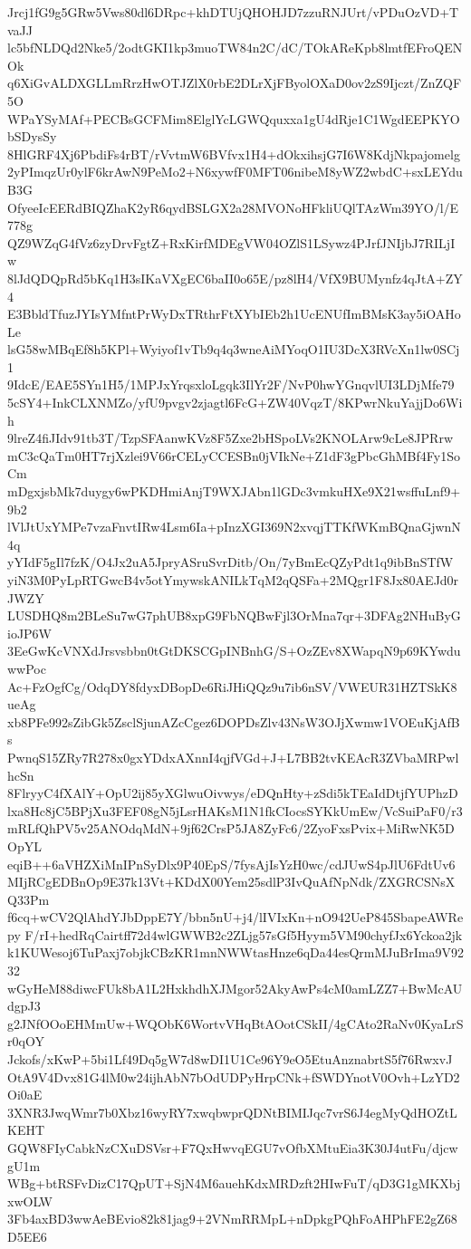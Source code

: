 Jrcj1fG9g5GRw5Vws80dl6DRpc+khDTUjQHOHJD7zzuRNJUrt/vPDuOzVD+TvaJJ
lc5bfNLDQd2Nke5/2odtGKI1kp3muoTW84n2C/dC/TOkAReKpb8lmtfEFroQENOk
q6XiGvALDXGLLmRrzHwOTJZlX0rbE2DLrXjFByolOXaD0ov2zS9Ijczt/ZnZQF5O
WPaYSyMAf+PECBsGCFMim8ElglYcLGWQquxxa1gU4dRje1C1WgdEEPKYObSDysSy
8HlGRF4Xj6PbdiFs4rBT/rVvtmW6BVfvx1H4+dOkxihsjG7I6W8KdjNkpajomelg
2yPImqzUr0ylF6krAwN9PeMo2+N6xywfF0MFT06nibeM8yWZ2wbdC+sxLEYduB3G
OfyeeIcEERdBIQZhaK2yR6qydBSLGX2a28MVONoHFkliUQlTAzWm39YO/l/E778g
QZ9WZqG4fVz6zyDrvFgtZ+RxKirfMDEgVW04OZlS1LSywz4PJrfJNIjbJ7RILjIw
8lJdQDQpRd5bKq1H3sIKaVXgEC6baII0o65E/pz8lH4/VfX9BUMynfz4qJtA+ZY4
E3BbldTfuzJYIsYMfntPrWyDxTRthrFtXYbIEb2h1UcENUfImBMsK3ay5iOAHoLe
lsG58wMBqEf8h5KPl+Wyiyof1vTb9q4q3wneAiMYoqO1IU3DcX3RVcXn1lw0SCj1
9IdcE/EAE5SYn1H5/1MPJxYrqsxloLgqk3IlYr2F/NvP0hwYGnqvlUI3LDjMfe79
5cSY4+InkCLXNMZo/yfU9pvgv2zjagtl6FcG+ZW40VqzT/8KPwrNkuYajjDo6Wih
9lreZ4fiJIdv91tb3T/TzpSFAanwKVz8F5Zxe2bHSpoLVs2KNOLArw9cLe8JPRrw
mC3cQaTm0HT7rjXzlei9V66rCELyCCESBn0jVIkNe+Z1dF3gPbcGhMBf4Fy1SoCm
mDgxjsbMk7duygy6wPKDHmiAnjT9WXJAbn1lGDc3vmkuHXe9X21wsffuLnf9+9b2
lVlJtUxYMPe7vzaFnvtIRw4Lsm6Ia+pInzXGI369N2xvqjTTKfWKmBQnaGjwnN4q
yYIdF5gIl7fzK/O4Jx2uA5JpryASruSvrDitb/On/7yBmEcQZyPdt1q9ibBnSTfW
yiN3M0PyLpRTGwcB4v5otYmywskANILkTqM2qQSFa+2MQgr1F8Jx80AEJd0rJWZY
LUSDHQ8m2BLeSu7wG7phUB8xpG9FbNQBwFjl3OrMna7qr+3DFAg2NHuByGioJP6W
3EeGwKcVNXdJrsvsbbn0tGtDKSCGpINBnhG/S+OzZEv8XWapqN9p69KYwduwwPoc
Ac+FzOgfCg/OdqDY8fdyxDBopDe6RiJHiQQz9u7ib6nSV/VWEUR31HZTSkK8ueAg
xb8PFe992sZibGk5ZsclSjunAZcCgez6DOPDsZlv43NsW3OJjXwmw1VOEuKjAfBs
PwnqS15ZRy7R278x0gxYDdxAXnnI4qjfVGd+J+L7BB2tvKEAcR3ZVbaMRPwlhcSn
8FlryyC4fXAlY+OpU2ij85yXGlwuOivwys/eDQnHty+zSdi5kTEaIdDtjfYUPhzD
lxa8Hc8jC5BPjXu3FEF08gN5jLsrHAKsM1N1fkCIocsSYKkUmEw/VcSuiPaF0/r3
mRLfQhPV5v25ANOdqMdN+9jf62CrsP5JA8ZyFc6/2ZyoFxsPvix+MiRwNK5DOpYL
eqiB++6aVHZXiMnIPnSyDlx9P40EpS/7fysAjIsYzH0wc/cdJUwS4pJlU6FdtUv6
MIjRCgEDBnOp9E37k13Vt+KDdX00Yem25sdlP3IvQuAfNpNdk/ZXGRCSNsXQ33Pm
f6cq+wCV2QlAhdYJbDppE7Y/bbn5nU+j4/lIVIxKn+nO942UeP845SbapeAWRepy
F/rI+hedRqCairtff72d4wlGWWB2c2ZLjg57sGf5Hyym5VM90chyfJx6Yckoa2jk
k1KUWesoj6TuPaxj7objkCBzKR1mnNWWtasHnze6qDa44esQrmMJuBrIma9V9232
wGyHeM88diwcFUk8bA1L2HxkhdhXJMgor52AkyAwPs4cM0amLZZ7+BwMcAUdgpJ3
g2JNfOOoEHMmUw+WQObK6WortvVHqBtAOotCSkII/4gCAto2RaNv0KyaLrSr0qOY
Jckofs/xKwP+5bi1Lf49Dq5gW7d8wDI1U1Ce96Y9eO5EtuAnznabrtS5f76RwxvJ
OtA9V4Dvx81G4lM0w24ijhAbN7bOdUDPyHrpCNk+fSWDYnotV0Ovh+LzYD2Oi0aE
3XNR3JwqWmr7b0Xbz16wyRY7xwqbwprQDNtBIMIJqc7vrS6J4egMyQdHOZtLKEHT
GQW8FIyCabkNzCXuDSVsr+F7QxHwvqEGU7vOfbXMtuEia3K30J4utFu/djcwgU1m
WBg+btRSFvDizC17QpUT+SjN4M6auehKdxMRDzft2HIwFuT/qD3G1gMKXbjxwOLW
3Fb4axBD3wwAeBEvio82k81jag9+2VNmRRMpL+nDpkgPQhFoAHPhFE2gZ68D5EE6
